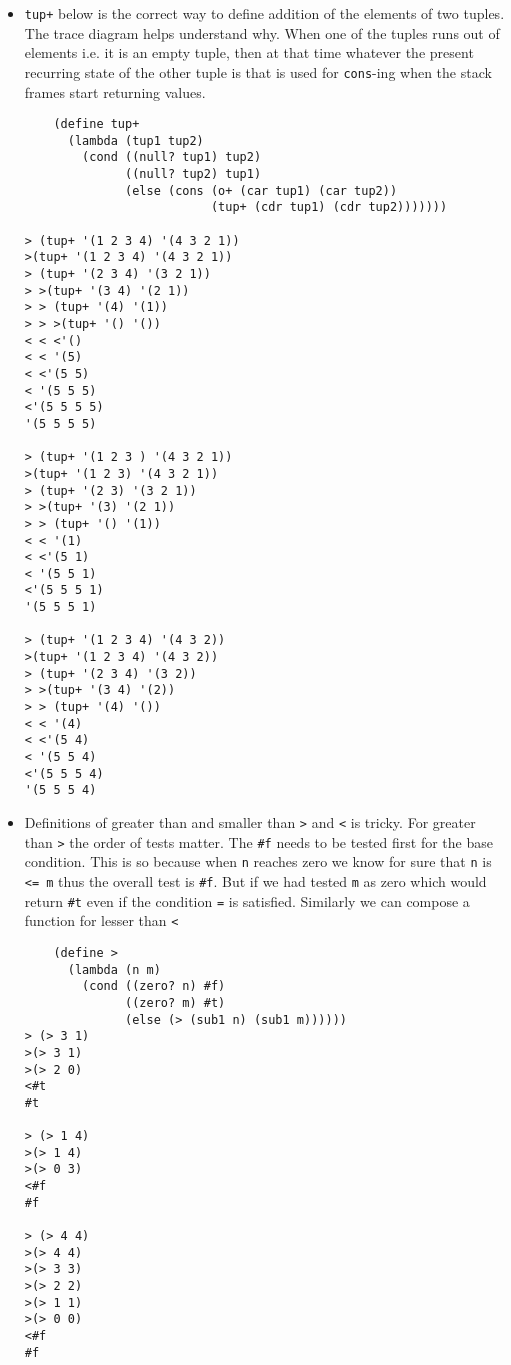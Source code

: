 \documentclass[11pt]{article}
\begin{document}
\begin{itemize}
\item \texttt{tup+} below is the correct way to define addition of the elements of two tuples. The trace diagram helps understand why. When one of the tuples
runs out of elements i.e. it is an empty tuple, then at that time whatever the present recurring state of the other tuple is that is used for
\texttt{cons}-ing when the stack frames start returning values.
\begin{verbatim}
    (define tup+
      (lambda (tup1 tup2)
        (cond ((null? tup1) tup2)
              ((null? tup2) tup1)
              (else (cons (o+ (car tup1) (car tup2))
                          (tup+ (cdr tup1) (cdr tup2)))))))

> (tup+ '(1 2 3 4) '(4 3 2 1))
>(tup+ '(1 2 3 4) '(4 3 2 1))
> (tup+ '(2 3 4) '(3 2 1))
> >(tup+ '(3 4) '(2 1))
> > (tup+ '(4) '(1))
> > >(tup+ '() '())
< < <'()
< < '(5)
< <'(5 5)
< '(5 5 5)
<'(5 5 5 5)
'(5 5 5 5)

> (tup+ '(1 2 3 ) '(4 3 2 1))
>(tup+ '(1 2 3) '(4 3 2 1))
> (tup+ '(2 3) '(3 2 1))
> >(tup+ '(3) '(2 1))
> > (tup+ '() '(1))
< < '(1)
< <'(5 1)
< '(5 5 1)
<'(5 5 5 1)
'(5 5 5 1)

> (tup+ '(1 2 3 4) '(4 3 2))
>(tup+ '(1 2 3 4) '(4 3 2))
> (tup+ '(2 3 4) '(3 2))
> >(tup+ '(3 4) '(2))
> > (tup+ '(4) '())
< < '(4)
< <'(5 4)
< '(5 5 4)
<'(5 5 5 4)
'(5 5 5 4)

\end{verbatim}

\item Definitions of greater than and smaller than \texttt{>} and \texttt{<} is tricky. For greater than \texttt{>} the order of tests  matter. The \texttt{\#f} needs to
be tested first for the base condition. This is so because when \texttt{n} reaches zero we know for sure that \texttt{n} is \texttt{<= m} thus the overall test
is \texttt{\#f}. But if we had tested \texttt{m} as zero which would return \texttt{\#t} even if the condition \texttt{=} is satisfied. Similarly we can compose a function
for lesser than \texttt{<}
\begin{verbatim}
    (define >
      (lambda (n m)
        (cond ((zero? n) #f)
              ((zero? m) #t)
              (else (> (sub1 n) (sub1 m))))))
> (> 3 1)
>(> 3 1)
>(> 2 0)
<#t
#t

> (> 1 4)
>(> 1 4)
>(> 0 3)
<#f
#f

> (> 4 4)
>(> 4 4)
>(> 3 3)
>(> 2 2)
>(> 1 1)
>(> 0 0)
<#f
#f

\end{verbatim}


\end{itemize}
\end{document}
